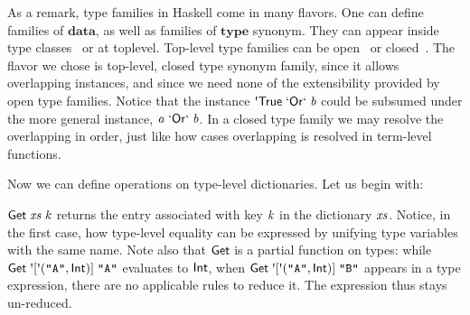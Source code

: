 As a remark, type families in Haskell come in many flavors. One can define families of \ensuremath{\mathbf{data}}, as well as families of \ensuremath{\mathbf{type}} synonym. They can appear
inside type classes~\cite{tfclass,tfsynonym} or at toplevel. Top-level type families can be open~\cite{tfopen} or closed~\cite{tfclosed}. The flavor we
chose is top-level, closed type synonym family, since it allows overlapping
instances, and since we need none of the extensibility provided by open type
families. Notice that the instance \ensuremath{\mbox{\textquotesingle}\Conid{True}\mathrel{\Conid{`Or`}}\Varid{b}} could be subsumed under the
more general instance, \ensuremath{\Varid{a}\mathrel{\Conid{`Or`}}\Varid{b}}. In a closed type family we may resolve the
overlapping in order, just like how cases overlapping is resolved in term-level
functions.

Now we can define operations on type-level dictionaries. Let us begin
with:
\resethooks
\ensuremath{\Conid{Get}\;\Varid{xs}\;\Varid{k}} returns the entry associated with key \ensuremath{\Varid{k}} in the
dictionary \ensuremath{\Varid{xs}}. Notice, in the first case, how type-level equality can be
expressed by unifying type variables with the same name. Note also that \ensuremath{\Conid{Get}} is
a partial function on types: while \ensuremath{\Conid{Get}\;\mbox{\textquotesingle}[\mbox{\textquotesingle}(\text{\tt \char34 A\char34},\Conid{Int})]\;\text{\tt \char34 A\char34}} evaluates
to \ensuremath{\Conid{Int}}, when \ensuremath{\Conid{Get}\;\mbox{\textquotesingle}[\mbox{\textquotesingle}(\text{\tt \char34 A\char34},\Conid{Int})]\;\text{\tt \char34 B\char34}} appears in a type expression,
there are no applicable rules to reduce it. The expression thus stays un-reduced.

